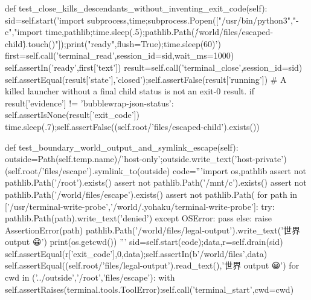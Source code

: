     def test_close_kills_descendants_without_inventing_exit_code(self):
        sid=self.start('import subprocess,time;subprocess.Popen(["/usr/bin/python3","-c","import time,pathlib;time.sleep(.5);pathlib.Path(\'/world/files/escaped-child\').touch()"]);print("ready",flush=True);time.sleep(60)')
        first=self.call('terminal_read',session_id=sid,wait_ms=1000)
        self.assertIn('ready',first['text'])
        result=self.call('terminal_close',session_id=sid)
        self.assertEqual(result['state'],'closed');self.assertFalse(result['running'])
        # A killed launcher without a final child status is not an exit-0 result.
        if result['evidence'] != 'bubblewrap-json-status': self.assertIsNone(result['exit_code'])
        time.sleep(.7);self.assertFalse((self.root/'files/escaped-child').exists())

    def test_boundary_world_output_and_symlink_escape(self):
        outside=Path(self.temp.name)/'host-only';outside.write_text('host-private')
        (self.root/'files/escape').symlink_to(outside)
        code='''import os,pathlib
assert not pathlib.Path('/root').exists()
assert not pathlib.Path('/mnt/c').exists()
assert not pathlib.Path('/world/files/escape').exists()
assert not pathlib.Path(%
for path in ['/usr/terminal-write-probe','/world/.yohaku/terminal-write-probe']:
 try: pathlib.Path(path).write_text('denied')
 except OSError: pass
 else: raise AssertionError(path)
pathlib.Path('/world/files/legal-output').write_text('世界 output 😀')
print(os.getcwd())
''' %
        sid=self.start(code);data,r=self.drain(sid)
        self.assertEqual(r['exit_code'],0,data);self.assertIn(b'/world/files',data)
        self.assertEqual((self.root/'files/legal-output').read_text(),'世界 output 😀')
        for cwd in ('../outside','/root','files/escape'):
            with self.assertRaises(terminal.tools.ToolError):self.call('terminal_start',cwd=cwd)


